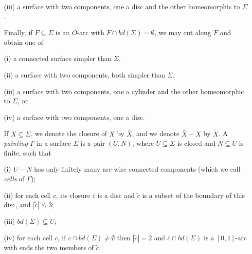 \hspace*{12pt}(iii) a surface with two components, one a disc and the other homeomorphic to $\Sigma$.

Finally, if $F \subseteq \Sigma$ is an $O$-arc with $F \cap bd(\Sigma) = \emptyset$, we may cut along $F$ and obtain one of

\hspace*{12pt}(i) a connected surface simpler than $\Sigma$,

\hspace*{12pt}(ii) a surface with two components, both simpler than $\Sigma$,

\hspace*{12pt}(iii) a surface with two components, one a cylinder and the other homeomorphic to $\Sigma$, or

\hspace*{12pt}(iv) a surface with two components, one a disc.

If $X \subseteq \Sigma$, we denote the closure of $X$ by $\bar{X}$, and we denote $\bar{X} - X$ by $\tilde{X}$. A \textit{painting} $\Gamma$ in a surface $\Sigma$ is a pair $(U, N)$, where $U \subseteq \Sigma$ is closed and $N \subseteq U$ is finite, such that

\hspace*{12pt}(i) $U - N$ has only finitely many arc-wise connected components (which we call \textit{cells} of $\Gamma$);

\hspace*{12pt}(ii) for each cell $c$, its closure $\bar{c}$ is a disc and $\tilde{c}$ is a subset of the boundary of this disc, and $|\tilde{c}| \le 3$;

\hspace*{12pt}(iii) $bd(\Sigma) \subseteq U$;

\hspace*{12pt}(iv) for each cell $c$, if $c \cap bd(\Sigma) \ne \emptyset$ then $|\tilde{c}| = 2$ and $\bar{c} \cap bd(\Sigma)$ is a $[0, 1]$-arc with ends the two members of $\tilde{c}$.
